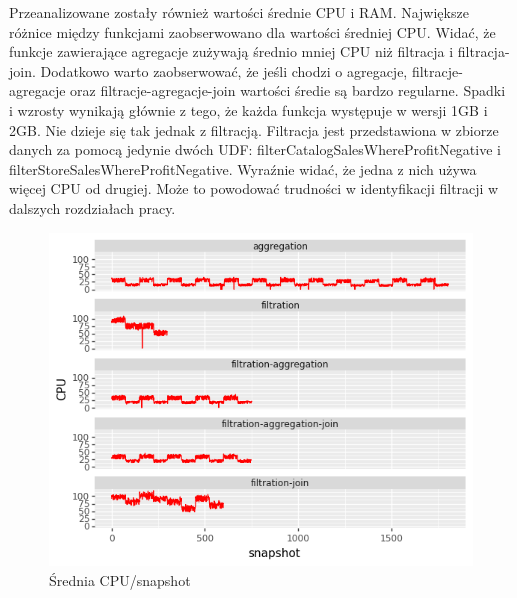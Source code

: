 Przeanalizowane zostały również wartości średnie CPU i RAM. Największe różnice między funkcjami zaobserwowano dla wartości średniej CPU. Widać, że funkcje zawierające agregacje zużywają średnio mniej CPU niż filtracja i filtracja-join. Dodatkowo warto zaobserwować, że jeśli chodzi o agregacje, filtracje-agregacje oraz filtracje-agregacje-join wartości średie są bardzo regularne. Spadki i wzrosty wynikają głównie z tego, że każda funkcja występuje w wersji 1GB i 2GB. Nie dzieje się tak jednak z filtracją. Filtracja jest przedstawiona w zbiorze danych za pomocą jedynie dwóch UDF: filterCatalogSalesWhereProfitNegative i filterStoreSalesWhereProfitNegative. Wyraźnie widać, że jedna z nich używa więcej CPU od drugiej. Może to powodować trudności w identyfikacji filtracji w dalszych rozdziałach pracy.
\begin{figure}[H]
    \centering
    \captionsetup{justification=centering,margin=0.5cm}
    \includegraphics[scale=1.0]{figures/04-opis-danych/data-analysis/all_mean_cpu.png}
    \caption{Średnia CPU/snapshot}
    \label{fig:scr46}
\end{figure}
